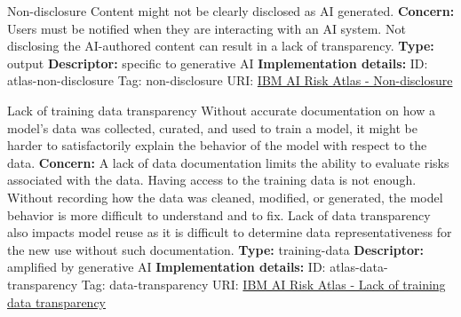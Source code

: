 \begin{definitionbox}{Non-disclosure}
Content might not be clearly disclosed as AI generated.\newline\newline
\textbf{Concern: }Users must be notified when they are interacting with an AI system. Not disclosing the AI-authored content can result in a lack of transparency.\newline\newline
\textbf{Type: }output\newline
\textbf{Descriptor: }specific to generative AI \newline\newline
\textbf{Implementation details: } \newline
ID: atlas-non-disclosure \newline
Tag: non-disclosure \newline
URI:  \href{https://www.ibm.com/docs/en/watsonx/saas?topic=SSYOK8/wsj/ai-risk-atlas/non-disclosure.html}{IBM AI Risk Atlas - Non-disclosure}\newline
\end{definitionbox}
\begin{definitionbox}{Lack of training data transparency}
Without accurate documentation on how a model's data was collected, curated, and used to train a model, it might be harder to satisfactorily explain the behavior of the model with respect to the data.\newline\newline
\textbf{Concern: }A lack of data documentation limits the ability to evaluate risks associated with the data. Having access to the training data is not enough. Without recording how the data was cleaned, modified, or generated, the model behavior is more difficult to understand and to fix. Lack of data transparency also impacts model reuse as it is difficult to determine data representativeness for the new use without such documentation.\newline\newline
\textbf{Type: }training-data\newline
\textbf{Descriptor: }amplified by generative AI \newline\newline
\textbf{Implementation details: } \newline
ID: atlas-data-transparency \newline
Tag: data-transparency \newline
URI:  \href{https://www.ibm.com/docs/en/watsonx/saas?topic=SSYOK8/wsj/ai-risk-atlas/data-transparency.html}{IBM AI Risk Atlas - Lack of training data transparency}\newline
\end{definitionbox}

